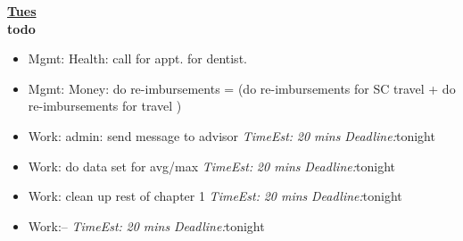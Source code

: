 \documentclass[11pt]{article}
\newcommand{\te}[1]{\textit{TimeEst:} \textit{#1}}
\newcommand{\dl}[1]{\textit{Deadline:}#1}
\begin{document}
{\textbf{\small \underline{Tues}} \\
\textbf{\small todo} \\
\begin{itemize}
\tiny \item \tiny Mgmt: Health: call for appt. for dentist. 
\item \tiny Mgmt: Money: do re-imbursements =  (do re-imbursements for SC travel + do re-imbursements for travel )  
\item \tiny Work: admin: send message to advisor \te{20 mins} \dl{tonight}  
\item \tiny Work: do data set for avg/max \te{20 mins} \dl{tonight} 
\item \tiny Work: clean up rest of chapter 1 \te{20 mins} \dl{tonight}  
\item \tiny Work:--  \te{20 mins} \dl{tonight} 


\end{itemize}}
\end{document}
